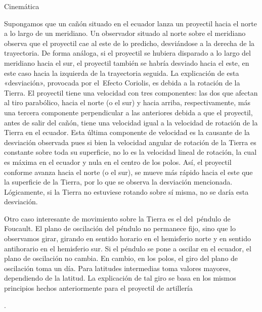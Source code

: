 \begin{myblock}{Cinemática}
\begin{small}
\vspace{2mm} Supongamos que un cañón situado en el ecuador lanza un proyectil hacia el norte a lo largo de un meridiano. Un observador situado al norte sobre el meridiano observa que el proyectil cae al este de lo predicho, desviándose a la derecha de la trayectoria. De forma análoga, si el proyectil se hubiera disparado a lo largo del meridiano hacia el sur, el proyectil también se habría desviado hacia el este, en este caso hacia la izquierda de la trayectoria seguida. La explicación de esta «desviación», provocada por el Efecto Coriolis, es debida a la rotación de la Tierra. El proyectil tiene una velocidad con tres componentes: las dos que afectan al tiro parabólico, hacia el norte (o el sur) y hacia arriba, respectivamente, más una tercera componente perpendicular a las anteriores debida a que el proyectil, antes de salir del cañón, tiene una velocidad igual a la velocidad de rotación de la Tierra en el ecuador. Esta última componente de velocidad es la causante de la desviación observada pues si bien la velocidad angular de rotación de la Tierra es constante sobre toda su superficie, no lo es la velocidad lineal de rotación, la cual es máxima en el ecuador y nula en el centro de los polos. Así, el proyectil conforme avanza hacia el norte (o el sur), se mueve más rápido hacia el este que la superficie de la Tierra, por lo que se observa la desviación mencionada. Lógicamente, si la Tierra no estuviese rotando sobre sí misma, no se daría esta desviación.

\vspace{2mm} Otro caso interesante de movimiento sobre la Tierra es el del péndulo de Foucault. El plano de oscilación del péndulo no permanece fijo, sino que lo observamos girar, girando en sentido horario en el hemisferio norte y en sentido antihorario en el hemisferio sur. Si el péndulo se pone a oscilar en el ecuador, el plano de oscilación no cambia. En cambio, en los polos, el giro del plano de oscilación toma un día. Para latitudes intermedias toma valores mayores, dependiendo de la latitud. La explicación de tal giro se basa en los mismos principios hechos anteriormente para el proyectil de artillería \end{small}\normalsize{.}
\end{myblock}



